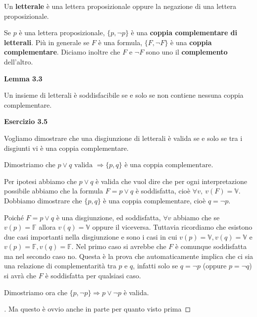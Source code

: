 \begin{flushleft}
Un \textbf{letterale} è una lettera proposizionale oppure la negazione di una 
lettera proposizionale.

Se $p$ è una lettera proposizionale, $\lbrace p, \neg{p} \rbrace$ è una
\textbf{coppia complementare di letterali}. Più in generale se $F$ è una formula, 
$\lbrace F, \neg{F} \rbrace$ è una \textbf{coppia complementare}. Diciamo inoltre
che $F$ e $\neg{F}$ sono uno il \textbf{complemento} dell'altro.

\bigskip

\textbf{Lemma 3.3}

Un insieme di letterali è soddisfacibile se e solo se non contiene nessuna coppia
complementare.

\bigskip

\textbf{Esercizio 3.5}

Vogliamo dimostrare che una disgiunzione di letterali è valida se e solo se tra 
i disgiunti vi è una coppia complementare.

\medskip

Dimostriamo che $p \lor q \text{ valida } \Rightarrow \lbrace p, q \rbrace \text{ è 
una coppia complementare}$.

\smallskip

Per ipotesi abbiamo che $p \lor q$ è valida che vuol dire che per ogni interpretazione 
possibile abbiamo che la formula $F = p \lor q$ è soddisfatta, cioè 
$\forall v, \: v(F) = \mathbb{V}$. Dobbiamo dimostrare che $\lbrace p, q \rbrace$ è 
una coppia complementare, cioè $q = \neg p$.

Poiché $F = p \lor q$ è una disgiunzione, ed soddisfatta, $\forall v$ abbiamo che 
se $v(p) = \mathbb{F}$ allora $v(q) = \mathbb{V}$ oppure il viceversa. Tuttavia ricordiamo
che esistono due casi importanti nella disgiunzione e sono i casi in cui $v(p) = \mathbb{V},
v(q) = \mathbb{V}$ e $v(p) = \mathbb{F}, v(q) = \mathbb{F}$. Nel primo caso si avrebbe che $F$
è comunque soddisfatta ma nel secondo caso no. Questa è la prova che automaticamente
implica che ci sia una relazione di complementarità tra $p$ e $q$, infatti solo se 
$q = \neg p$ (oppure $p = \neg q$) si avrà che $F$ è soddisfatta per qualsiasi caso.

\medskip

Dimostriamo ora che $\lbrace p, \neg p \rbrace \Rightarrow p \lor \neg p$ è valida.

\begin{proof}[\unskip\nopunct]
Ma questo è ovvio anche in parte per quanto visto prima
\end{proof}


\end{flushleft}
